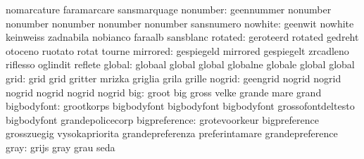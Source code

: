                            nomarcature               faramarcare
                           sansmarquage
                 nonumber: geennummer                nonumber
                           nonumber                  nonumber
                           nonumber                  nonumber
                           sansnumero
                  nowhite: geenwit                   nowhite
                           keinweiss                 zadnabila
                           nobianco                  faraalb
                           sansblanc
                  rotated: geroteerd                 rotated
                           gedreht                   otoceno
                           ruotato                   rotat
                           tourne
                 mirrored: gespiegeld                mirrored
                           gespiegelt                zrcadleno
                           riflesso                  oglindit
                           reflete
                   global: globaal                   global
                           global                    globalne
                           globale                   global
                           global
                     grid: grid                      grid
                           gritter                   mrizka
                           griglia                   grila
                           grille
                   nogrid: geengrid                  nogrid
                           nogrid                    nogrid
                           nogrid                    nogrid
                           nogrid
                      big: groot                     big
                           gross                     velke
                           grande                    mare
                           grand
              bigbodyfont: grootkorps                bigbodyfont
                           bigbodyfont               bigbodyfont
                           grossofontdeltesto        bigbodyfont
                           grandepolicecorp
            bigpreference: grotevoorkeur             bigpreference
                           grosszuegig               vysokapriorita
                           grandepreferenza          preferintamare
                           grandepreference
                     gray: grijs                     gray
                           grau                      seda
